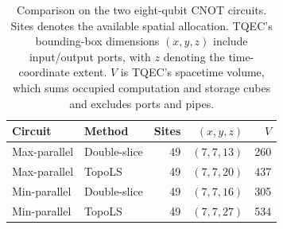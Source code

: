 \begin{table}[t]
    \centering
    \caption{Comparison on the two eight-qubit CNOT circuits.
    Sites denotes the available spatial allocation.
    TQEC's bounding-box dimensions $(x, y, z)$ include input/output ports, with $z$ denoting the time-coordinate extent.
    $V$ is TQEC's spacetime volume, which sums occupied computation and storage cubes and excludes ports and pipes.}
    \label{tab:topols_comparison}
    \begin{tabular}{llrrr}
        \toprule
        Circuit & Method & Sites & $(x, y, z)$ & $V$ \\
        \midrule
        Max-parallel & Double-slice & 49 & $(7, 7, 13)$ & 260 \\
        Max-parallel & TopoLS & 49 & $(7, 7, 20)$ & 437 \\
        Min-parallel & Double-slice & 49 & $(7, 7, 16)$ & 305 \\
        Min-parallel & TopoLS & 49 & $(7, 7, 27)$ & 534 \\
        \bottomrule
    \end{tabular}
\end{table}
